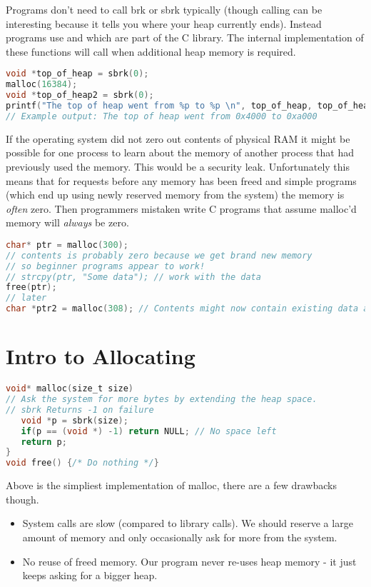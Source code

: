 Programs don't need to call brk or sbrk typically (though calling  can be interesting because it tells you where your heap currently ends). Instead programs use  and  which are part of the C library. The internal implementation of these functions will call  when additional heap memory is required.

\begin{lstlisting}[language=C]
void *top_of_heap = sbrk(0);
malloc(16384);
void *top_of_heap2 = sbrk(0);
printf("The top of heap went from %p to %p \n", top_of_heap, top_of_heap2);
// Example output: The top of heap went from 0x4000 to 0xa000
\end{lstlisting}

If the operating system did not zero out contents of physical RAM it might be possible for one process to learn about the memory of another process that had previously used the memory. This would be a security leak. Unfortunately this means that for  requests before any memory has been freed and simple programs (which end up using newly reserved memory from the system) the memory is \emph{often} zero. Then programmers mistaken write C programs that assume malloc'd memory will \emph{always} be zero.

\begin{lstlisting}[language=C]
char* ptr = malloc(300);
// contents is probably zero because we get brand new memory
// so beginner programs appear to work!
// strcpy(ptr, "Some data"); // work with the data
free(ptr);
// later
char *ptr2 = malloc(308); // Contents might now contain existing data and is probably not zero
\end{lstlisting}

\section{Intro to Allocating}

\begin{lstlisting}[language=C]
void* malloc(size_t size)
// Ask the system for more bytes by extending the heap space. 
// sbrk Returns -1 on failure
   void *p = sbrk(size); 
   if(p == (void *) -1) return NULL; // No space left
   return p;
}
void free() {/* Do nothing */}
\end{lstlisting}

Above is the simpliest implementation of malloc, there are a few drawbacks though.

\begin{itemize}
\item System calls are slow (compared to library calls). We should reserve a large amount of memory and only occasionally ask for more from the system. 
\item No reuse of freed memory. Our program never re-uses heap memory - it just keeps asking for a bigger heap.
\end{itemize}

